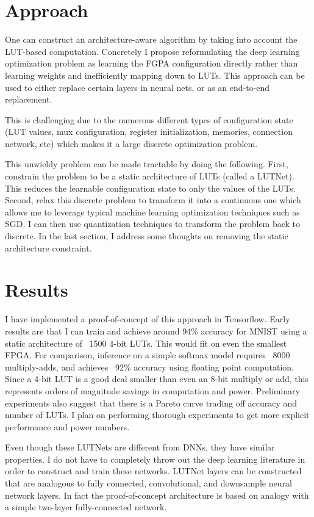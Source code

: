 \documentclass{article}
\begin{document}
\section{Approach}
One can construct an architecture-aware algorithm by taking into account the LUT-based computation. Concretely I propose reformulating the deep learning optimization problem as learning the FGPA configuration directly rather than learning weights and inefficiently mapping down to LUTs. This approach can be used to either replace certain layers in neural nets, or as an end-to-end replacement. 

This is challenging due to the numerous different types of configuration state (LUT values, mux configuration, register initialization, memories, connection network, etc) which makes it a large discrete optimization problem.

This unwieldy problem can be made tractable by doing the following. First, constrain the problem to be a static architecture of LUTs (called a LUTNet). This reduces the learnable configuration state to only the values of the LUTs. Second, relax this discrete problem to transform it into a continuous one which allows me to leverage typical machine learning optimization techniques such as SGD. I can then use quantization techniques to transform the problem back to discrete. In the last section, I address some thoughts on removing the static architecture constraint.

\section{Results}
I have implemented a proof-of-concept of this approach in Tensorflow. Early results are that I can train and achieve around 94\% accuracy for MNIST using a static architecture of ~1500 4-bit LUTs. This would fit on even the smallest FPGA. For comparison, inference on a simple softmax model requires ~8000 multiply-adds, and achieves ~92\% accuracy using floating point computation. Since a 4-bit LUT is a good deal smaller than even an 8-bit multiply or add, this represents orders of magnitude savings in computation and power. Preliminary experiments also suggest that there is a Pareto curve trading off accuracy and number of LUTs. I plan on performing thorough experiments to get more explicit performance and power numbers.

Even though these LUTNets are different from DNNs, they have similar properties. I do not have to completely throw out the deep learning literature in order to construct and train these networks. LUTNet layers can be constructed that are analogous to fully connected, convolutional, and downsample neural network layers. In fact the proof-of-concept architecture is based on analogy with a simple two-layer fully-connected network.
\end{document}
